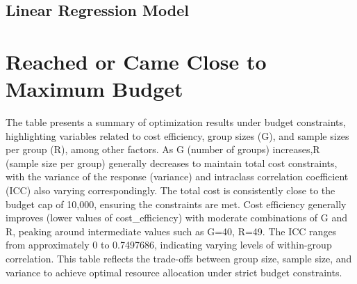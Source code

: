 \documentclass[
]{article}
\begin{document}
\hypertarget{linear-regression-model}{%
\subsection{Linear Regression Model}\label{linear-regression-model}}

\hypertarget{reached-or-came-close-to-maximum-budget}{%
\section{Reached or Came Close to Maximum
Budget}\label{reached-or-came-close-to-maximum-budget}}

The table presents a summary of optimization results under budget
constraints, highlighting variables related to cost efficiency, group
sizes (G), and sample sizes per group (R), among other factors. As G
(number of groups) increases,R (sample size per group) generally
decreases to maintain total cost constraints, with the variance of the
response (variance) and intraclass correlation coefficient (ICC) also
varying correspondingly. The total cost is consistently close to the
budget cap of 10,000, ensuring the constraints are met. Cost efficiency
generally improves (lower values of cost\_efficiency) with moderate
combinations of G and R, peaking around intermediate values such as
G=40, R=49. The ICC ranges from approximately 0 to 0.7497686, indicating
varying levels of within-group correlation. This table reflects the
trade-offs between group size, sample size, and variance to achieve
optimal resource allocation under strict budget constraints.
\end{document}
